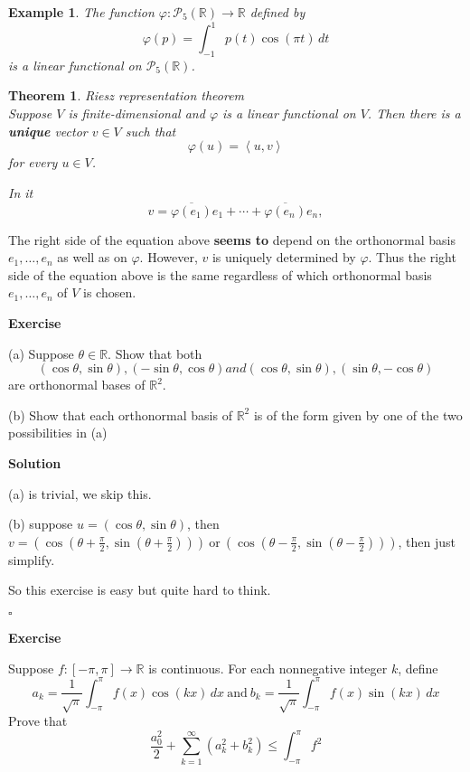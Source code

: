 \documentclass{article}
\newtheorem{theorem}{Theorem}[subsection]
\newtheorem{example}{Example}[subsection]
\newenvironment{exercise}{%
{\textbf{Exercise\\}
    }
}{
}
\newenvironment{solution}{%
{
    \textbf{Solution\\}
    }
}{
  \hfill $\square$ 
  \par\bigskip 
}
\newcommand{\RR}{\mathbb{R}}
\begin{document}
\begin{CJK}{UTF8}{gkai}
\begin{example}
    The function $\varphi: \mathcal{P}_5(\RR) \rightarrow \RR$ defined by
    \[\varphi(p) = \int_{-1}^{1}p(t) \cos(\pi t) \, dt\]
    is a linear functional on $\mathcal{P}_5(\RR)$.
\end{example}

\begin{theorem}
    Riesz representation theorem\\

    Suppose $V$ is finite-dimensional and $\varphi$ is a linear functional on $V$. Then there is a \textbf{unique} vector $v \in V$ such that
    \[\varphi(u) = \left<u,v\right>\]
    for every $u \in V$.

    In it 
    \[ v =\overline{\varphi(e_1)}e_1 +\cdots+\overline{\varphi(e_n)}e_n,\]
\end{theorem}

    The right side of the equation above \textbf{seems to} depend on the orthonormal basis $e_1, \ldots,e_n$ as well as on $\varphi$. However, $v$ is uniquely determined by $\varphi$. Thus the right side of the equation above is the same regardless of which orthonormal basis $e_1,\ldots,e_n$ of $V$ is chosen.

\begin{exercise}
    (a) Suppose $\theta \in \RR$. Show that both
    \[(\cos\theta,\sin\theta),(-\sin\theta,\cos\theta) and (\cos\theta,\sin\theta),(\sin\theta,-\cos\theta)\]
    are orthonormal bases of $\RR^2$.

    (b) Show that each orthonormal basis of $\RR^2$ is of the form given by one of the two possibilities in (a)
\end{exercise}

\begin{solution}
    (a) is trivial, we skip this.

    (b) suppose $u = (\cos \theta, \sin \theta)$, then $v = (\cos (\theta + \frac{\pi}{2}, \sin (\theta + \frac{\pi}{2}))) ~\text{or}~ (\cos (\theta - \frac{\pi}{2}, \sin (\theta - \frac{\pi}{2})))$, then just simplify.

    So this exercise is easy but quite hard to think.
\end{solution}
    
\begin{exercise}
    Suppose $f: [-\pi,\pi] \to \RR$ is continuous. For each nonnegative integer $k$, define
    \[a_k = \dfrac{1}{\sqrt{\pi}} \int_{-\pi}^{\pi}f(x)\cos(kx)\, dx ~\text{and}~ b_k = \dfrac{1}{\sqrt{\pi}} \int_{-\pi}^{\pi}f(x)\sin(kx)\, dx\]
    Prove that
    \[\dfrac{a_0^2}{2} + \sum_{k = 1}^\infty (a_k^2 + b_k^2) \leq  \int_{-\pi}^{\pi}f^2\]


\end{exercise}
\end{CJK}
\end{document}
